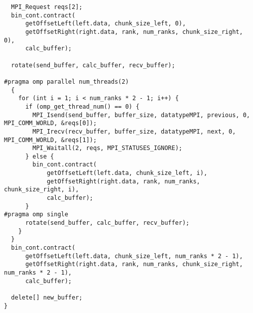 {\begin{verbatim}
  MPI_Request reqs[2];
  bin_cont.contract(
      getOffsetLeft(left.data, chunk_size_left, 0),
      getOffsetRight(right.data, rank, num_ranks, chunk_size_right, 0),
      calc_buffer);

  rotate(send_buffer, calc_buffer, recv_buffer);

#pragma omp parallel num_threads(2)
  {
    for (int i = 1; i < num_ranks * 2 - 1; i++) {
      if (omp_get_thread_num() == 0) {
        MPI_Isend(send_buffer, buffer_size, datatypeMPI, previous, 0, MPI_COMM_WORLD, &reqs[0]);
        MPI_Irecv(recv_buffer, buffer_size, datatypeMPI, next, 0, MPI_COMM_WORLD, &reqs[1]);
        MPI_Waitall(2, reqs, MPI_STATUSES_IGNORE);
      } else {
        bin_cont.contract(
            getOffsetLeft(left.data, chunk_size_left, i),
            getOffsetRight(right.data, rank, num_ranks, chunk_size_right, i),
            calc_buffer);
      }
#pragma omp single
      rotate(send_buffer, calc_buffer, recv_buffer);
    }
  }
  bin_cont.contract(
      getOffsetLeft(left.data, chunk_size_left, num_ranks * 2 - 1),
      getOffsetRight(right.data, rank, num_ranks, chunk_size_right, num_ranks * 2 - 1),
      calc_buffer);

  delete[] new_buffer;
}
\end{verbatim}}